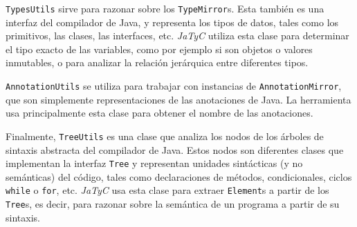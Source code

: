 \texttt{TypesUtils} sirve para razonar sobre los \texttt{TypeMirror}s. Esta también es una interfaz del compilador de Java, y representa los tipos de datos, tales como los primitivos, las clases, las interfaces, etc. \textit{JaTyC} utiliza esta clase para determinar el tipo exacto de las variables, como por ejemplo si son objetos o valores inmutables, o para analizar la relación jerárquica entre diferentes tipos.

\texttt{AnnotationUtils} se utiliza para trabajar con instancias de \texttt{AnnotationMirror}, que son simplemente representaciones de las anotaciones de Java. La herramienta usa principalmente esta clase para obtener el nombre de las anotaciones.

Finalmente, \texttt{TreeUtils} es una clase que analiza los nodos de los árboles de sintaxis abstracta del compilador de Java. Estos nodos son diferentes clases que implementan la interfaz \texttt{Tree} y representan unidades sintácticas (y no semánticas) del código, tales como declaraciones de métodos, condicionales, ciclos \texttt{while} o \texttt{for}, etc. \textit{JaTyC} usa esta clase para extraer \texttt{Element}s a partir de los \texttt{Tree}s, es decir, para razonar sobre la semántica de un programa a partir de su sintaxis.
